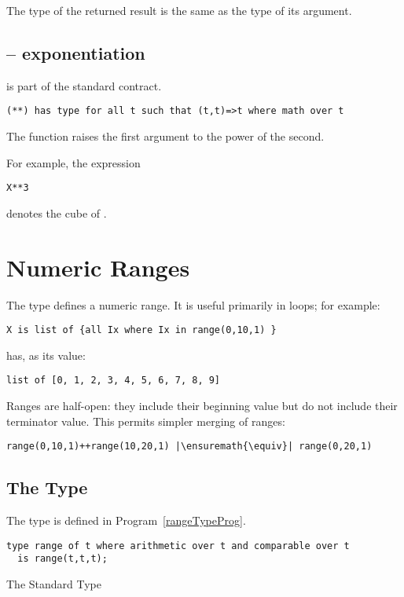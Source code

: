 The type of the returned result is the same as the type of its argument.

\subsection{\q{**} -- exponentiation}
\label{powerFunction}
\q{**} is part of the standard  contract.
\begin{lstlisting}
(**) has type for all t such that (t,t)=>t where math over t
\end{lstlisting}
The \q{**} function raises the first argument to the power of the second.

For example, the expression
\begin{lstlisting}
X**3
\end{lstlisting}
denotes the cube of .

\section{Numeric Ranges}
\label{numericRange}
The  type defines a numeric range. It is useful primarily in loops; for example:
\begin{lstlisting}
X is list of {all Ix where Ix in range(0,10,1) }
\end{lstlisting}
has, as its value:
\begin{lstlisting}
list of [0, 1, 2, 3, 4, 5, 6, 7, 8, 9]
\end{lstlisting}

\begin{aside}
Ranges are half-open: they include their beginning value but do not include their terminator value. This permits simpler merging of ranges:
\begin{lstlisting}[escapechar=|]
range(0,10,1)++range(10,20,1) |\ensuremath{\equiv}| range(0,20,1)
\end{lstlisting}
\end{aside}

\subsection{The  Type}
The  type is defined in Program~\vref{rangeTypeProg}.
\begin{program}
\begin{lstlisting}
type range of t where arithmetic over t and comparable over t 
  is range(t,t,t);
\end{lstlisting}
\caption{The Standard  Type\label{rangeTypeProg}}
\end{program}

